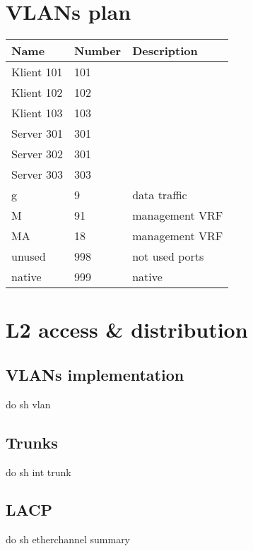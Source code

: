 \documentclass[english,master,dept460,male,cpp,cpdeclaration]{diploma}
\begin{document}
\MakeTitlePages

\section{VLANs plan}
\label{sec:Sec01}
\begin{tabular}{l|l|l}
	Name & Number & Description \\
	\hline
	Klient 101 & 101 & \\
	Klient 102 & 102 & \\
	Klient 103 & 103 & \\
	Server 301 & 301 & \\
	Server 302 & 301 & \\
	Server 303 & 303 & \\
	g & 9 & data traffic\\
	M & 91 & management VRF\\
	MA & 18 & management VRF\\
	unused & 998 & not used ports \\
	native & 999 & native \\
\end{tabular}


\newpage
\section{L2 access \& distribution}
\label{sec:Sec02}

\subsection{VLANs implementation}
\label{subsec:Sec021}
\noindent do sh vlan

\subsection{Trunks}
\label{subsec:Sec022}
\noindent do sh int trunk

\subsection{LACP}
\label{subsec:Sec023}
\noindent do sh etherchannel summary
\end{document}
